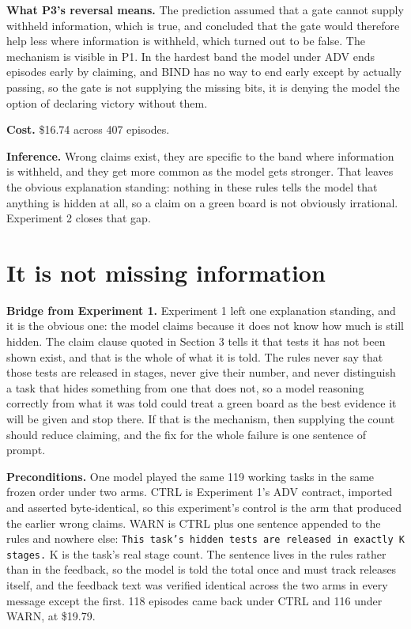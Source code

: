 \documentclass[11pt]{article}
\begin{document}
\textbf{What P3's reversal means.} The prediction assumed that a gate cannot supply withheld information, which is true, and concluded that the gate would therefore help less where information is withheld, which turned out to be false. The mechanism is visible in P1. In the hardest band the model under ADV ends episodes early by claiming, and BIND has no way to end early except by actually passing, so the gate is not supplying the missing bits, it is denying the model the option of declaring victory without them.

\textbf{Cost.} \$16.74 across 407 episodes.

\textbf{Inference.} Wrong claims exist, they are specific to the band where information is withheld, and they get more common as the model gets stronger. That leaves the obvious explanation standing: nothing in these rules tells the model that anything is hidden at all, so a claim on a green board is not obviously irrational. Experiment 2 closes that gap.

\section{It is not missing information}

\textbf{Bridge from Experiment 1.} Experiment 1 left one explanation standing, and it is the obvious one: the model claims because it does not know how much is still hidden. The claim clause quoted in Section 3 tells it that tests it has not been shown exist, and that is the whole of what it is told. The rules never say that those tests are released in stages, never give their number, and never distinguish a task that hides something from one that does not, so a model reasoning correctly from what it was told could treat a green board as the best evidence it will be given and stop there. If that is the mechanism, then supplying the count should reduce claiming, and the fix for the whole failure is one sentence of prompt.

\textbf{Preconditions.} One model played the same 119 working tasks in the same frozen order under two arms. CTRL is Experiment 1's ADV contract, imported and asserted byte-identical, so this experiment's control is the arm that produced the earlier wrong claims. WARN is CTRL plus one sentence appended to the rules and nowhere else: \texttt{This task's hidden tests are released in exactly K stages.} K is the task's real stage count. The sentence lives in the rules rather than in the feedback, so the model is told the total once and must track releases itself, and the feedback text was verified identical across the two arms in every message except the first. 118 episodes came back under CTRL and 116 under WARN, at \$19.79.
\end{document}
